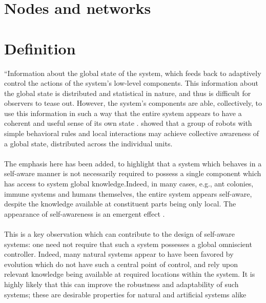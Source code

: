 \documentclass{article}
\begin{document}
	
	
	\section{Nodes and networks}
		\cite{agne-2016-self-aware-compute-nodes}
	
	\section{Definition}
		“Information about the global state of the system, which feeds back to adaptively control the actions of the system’s low-level components. This information about the global state is distributed and statistical in nature, and thus is difficult for observers to tease out. However, the system’s components are able, collectively, to use this information in such a way that the entire system appears to have a coherent and useful sense of its own state \citep{mitchell-2005-self-awareness-and-control-in-decentralized-systems}. \cite{schmickl-2011-cocoro-the-self-aware-underwater-swarm} showed that a group of robots with simple behavioral rules
		and local interactions may achieve collective awareness of a global state, distributed across the individual units.
		
		\paragraph{} The emphasis here has been added, to highlight that a system which behaves in a self-aware manner is not necessarily required to possess a single component which has access to system global knowledge.Indeed, in many cases, e.g., ant colonies, immune systems and humans themselves, the entire system appears self-aware, despite the knowledge available at constituent parts being only local. The appearance of self-awareness is an emergent effect \citet{mitchell-2005-self-awareness-and-control-in-decentralized-systems}.
		
		\paragraph{} This is a key observation which can contribute to the design of self-aware systems: one need not require that such a system possesses a global omniscient controller. Indeed, many natural systems appear to have been favored
		by evolution which do not have such a central point of control, and rely upon relevant knowledge being available
		at required locations within the system. It is highly likely that this can improve the robustness and adaptability of
		such systems; these are desirable properties for natural and artificial systems alike
		
\end{document}
